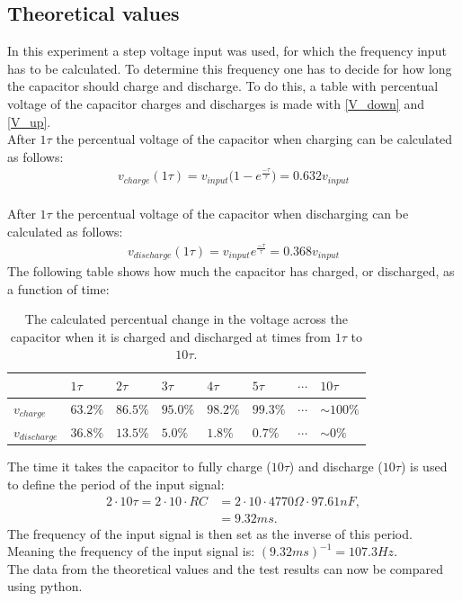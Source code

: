 \subsection{Theoretical values}
In this experiment a step voltage input was used, for which the frequency input has to be calculated. To determine this frequency one has to decide for how long the capacitor should charge and discharge. To do this, a table with percentual voltage of the capacitor charges and discharges is made with \eqref{V_down} and \eqref{V_up}.
\\
After $1\tau$ the percentual voltage of the capacitor when charging can be calculated as follows:
\begin{align*}
v_{charge}(1\tau)=v_{input}\bigg(1-e^{\frac{-\tau}{\tau}}\bigg )=0.632v_{input}
\end{align*}
\\
After $1\tau$ the percentual voltage of the capacitor when discharging can be calculated as follows:
\begin{align*}
v_{discharge}(1\tau)=v_{input}e^{\frac{-\tau}{\tau}}=0.368v_{input}
\end{align*}
The following table shows how much the capacitor has charged, or discharged, as a function of time:
\begin{table}[H]
\center
\begin{tabular}{|l|l|l|l|l|l|l|l|}
\hline
                & $1\tau$  & $2\tau$  & $3\tau$  & $4\tau$  & $5\tau$  & $\cdots$ & $10\tau$      \\ \hline
$v_{charge}$    & $63.2\%$ & $86.5\%$ & $95.0\%$ & $98.2\%$ & $99.3\%$ & $\cdots$ & $ \sim 100\%$ \\ \hline
$v_{discharge}$ & $36.8\%$ & $13.5\%$ & $5.0\%$  & $1.8\%$  & $0.7\%$  & $\cdots$ & $\sim 0\%$    \\ \hline
\end{tabular}
\caption{The calculated percentual change in the voltage across the capacitor when it is charged and discharged at times from $1\tau$ to $10\tau$.}
\end{table}
\noindent
The time it takes the capacitor to fully charge ($10\tau$) and discharge ($10\tau$) is used to define the period of the input signal:
\begin{align}
2\cdot 10\tau=2\cdot 10 \cdot RC&=2\cdot 10 \cdot 4770\Omega \cdot 97.61 nF, \nonumber
\\
&=9.32 ms. \label{rc:tau:full}
\end{align} 
The frequency of the input signal is then set as the inverse of this period. Meaning the frequency of the input signal is:  $(9.32ms)^{-1} = 107.3 Hz$.
\\
The data from the theoretical values and the test results can now be compared using python.
